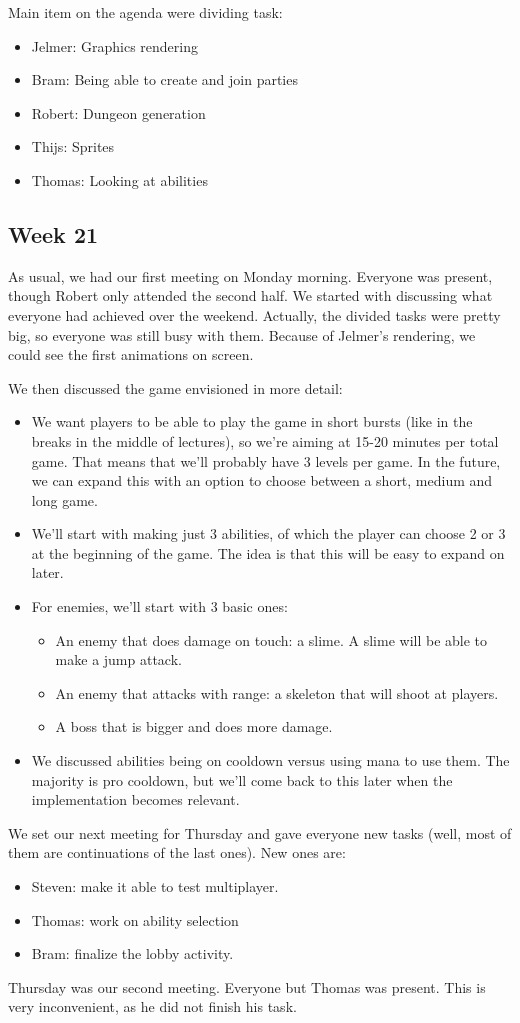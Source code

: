 \documentclass[../main.tex]{subfiles}
\begin{document}
Main item on the agenda were dividing task:
\begin{itemize}
	\item Jelmer: Graphics rendering
	\item Bram: Being able to create and join parties
	\item Robert: Dungeon generation
	\item Thijs: Sprites
	\item Thomas: Looking at abilities
\end{itemize}

\subsection*{Week 21}
As usual, we had our first meeting on Monday morning. Everyone was present, though Robert only attended the second half. We started with discussing what everyone had achieved over the weekend. Actually, the divided tasks were pretty big, so everyone was still busy with them. Because of Jelmer's rendering, we could see the first animations on screen. 

We then discussed the game envisioned in more detail:
\begin{itemize}
	\item We want players to be able to play the game in short bursts (like in the breaks in the middle of lectures), so we're aiming at 15-20 minutes per total game. That means that we'll probably have 3 levels per game. In the future, we can expand this with an option to choose between a short, medium and long game.
	\item We'll start with making just 3 abilities, of which the player can choose 2 or 3 at the beginning of the game. The idea is that this will be easy to expand on later.
	\item For enemies, we'll start with 3 basic ones:
	\begin{itemize}
		\item An enemy that does damage on touch: a slime. A slime will be able to make a jump attack.
		\item An enemy that attacks with range: a skeleton that will shoot at players.
		\item A boss that is bigger and does more damage.
	\end{itemize}
	\item We discussed abilities being on cooldown versus using mana to use them. The majority is pro cooldown, but we'll come back to this later when the implementation becomes relevant.
\end{itemize}
We set our next meeting for Thursday and gave everyone new tasks (well, most of them are continuations of the last ones). New ones are:
\begin{itemize}
	\item Steven: make it able to test multiplayer.
	\item Thomas: work on ability selection
	\item Bram: finalize the lobby activity.
\end{itemize}
\bigbreak\noindent
Thursday was our second meeting. Everyone but Thomas was present. This is very inconvenient, as he did not finish his task.
\end{document}
